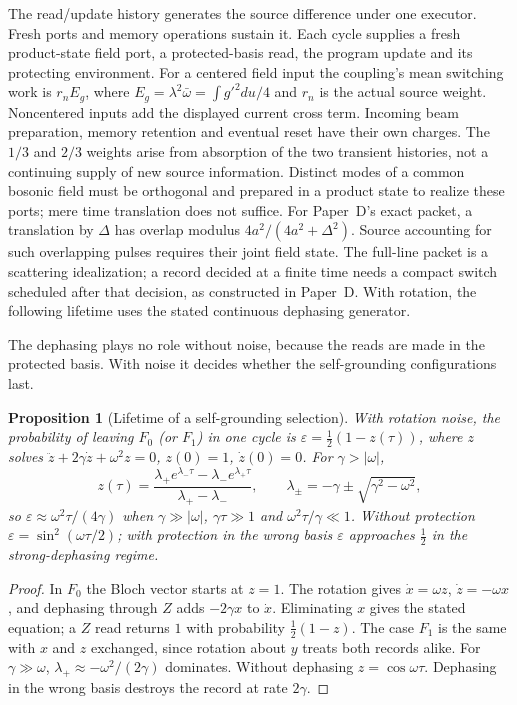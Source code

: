 \documentclass[12pt,a4paper]{article}
\newtheorem{proposition}[theorem]{Proposition}
\begin{document}
The read/update history generates the source difference under one executor.
Fresh ports and memory operations sustain it. Each cycle supplies a fresh
product-state field port, a protected-basis read, the program update and
its protecting environment. For a centered field input the coupling's
mean switching work is $r_nE_g$, where
$E_g=\lambda^2\bar\omega=\int g'^2du/4$ and $r_n$ is the actual source
weight. Noncentered inputs add the displayed current cross term.
Incoming beam preparation, memory retention and eventual reset have
their own charges. The $1/3$ and $2/3$ weights arise from absorption
of the two transient histories, not a continuing supply of new
source information. Distinct modes of a common bosonic
field must be orthogonal and prepared in a product state to realize these ports;
mere time translation does not suffice. For Paper~D's exact packet, a translation
by $\Delta$ has overlap modulus $4a^2/(4a^2+\Delta^2)$. Source accounting for such
overlapping pulses requires their joint field state. The full-line packet is a
scattering idealization; a record decided at a finite time needs a compact switch
scheduled after that decision, as constructed in Paper~D. With rotation, the
following lifetime uses the stated continuous dephasing generator.

The dephasing plays no role without noise, because the reads are made in the protected basis. With noise it decides whether the self-grounding configurations last.

\begin{proposition}[Lifetime of a self-grounding selection]
\label{prop:noise}
With rotation noise, the probability of leaving $F_0$ (or $F_1$) in one cycle is $\varepsilon=\frac12(1-z(\tau))$, where $z$ solves $\ddot z+2\gamma\dot z+\omega^2z=0$, $z(0)=1$, $\dot z(0)=0$. For $\gamma>|\omega|$,
\[
z(\tau)=\frac{\lambda_+e^{\lambda_-\tau}-\lambda_-e^{\lambda_+\tau}}{\lambda_+-\lambda_-},\qquad\lambda_\pm=-\gamma\pm\sqrt{\gamma^2-\omega^2},
\]
so $\varepsilon\approx\omega^2\tau/(4\gamma)$ when $\gamma\gg|\omega|$, $\gamma\tau\gg1$ and $\omega^2\tau/\gamma\ll1$. Without protection $\varepsilon=\sin^2(\omega\tau/2)$; with protection in the wrong basis $\varepsilon$ approaches $\frac12$ in the strong-dephasing regime.
\end{proposition}

\begin{proof}
In $F_0$ the Bloch vector starts at $z=1$. The rotation gives $\dot x=\omega z$, $\dot z=-\omega x$, and dephasing through $Z$ adds $-2\gamma x$ to $\dot x$. Eliminating $x$ gives the stated equation; a $Z$ read returns $1$ with probability $\frac12(1-z)$. The case $F_1$ is the same with $x$ and $z$ exchanged, since rotation about $y$ treats both records alike. For $\gamma\gg\omega$, $\lambda_+\approx-\omega^2/(2\gamma)$ dominates. Without dephasing $z=\cos\omega\tau$. Dephasing in the wrong basis destroys the record at rate $2\gamma$.
\end{proof}
\end{document}
